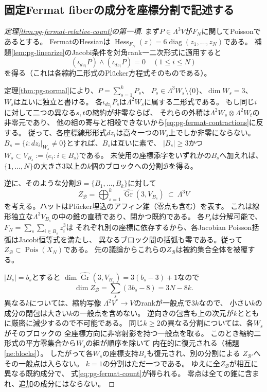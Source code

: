 \subsection{固定Fermat fiberの成分を座標分割で記述する}
\begin{proof}[定理\ref{thm:pg-fermat-relative-count}の第一項]
まず$P\in\Lambda^3V$が$F_N$に関してPoissonであるとする。
FermatのHessianは
$\operatorname{Hess}_{F_N}(z)=6\operatorname{diag}(z_1,\ldots,z_N)$である。
補題\ref{lem:pg-linearize}のJacobi条件を対角rank一二次形式に適用すると
\begin{equation}
 \label{eq:pg-fermat-contractions}
 (\iota_{dz_i}P)\wedge(\iota_{dz_i}P)=0
 \quad(1\le i\le N)
\end{equation}
を得る（これは各縮約二形式のPl\"ucker方程式そのものである）。

定理\ref{thm:pg-normal}により、$P=\sum_{s=1}^k P_s$、
$P_s\in\Lambda^3 W_s\setminus\{0\}$、$\dim W_s=3$、
$W_s$は互いに独立と書ける。
各$\iota_{dz_i}P_s$は$\Lambda^2W_s$に属する二形式である。
もし同じ$i$に対して二つの異なる$s,t$の縮約が非零ならば、
それらの外積は$\Lambda^2W_s\otimes\Lambda^2W_t$の非零元であり、
他の組の寄与と相殺できないから\eqref{eq:pg-fermat-contractions}に反する。
従って、各座標線形形式$dz_i$は高々一つの$W_s$上でしか非零にならない。
$B_s=\{i:dz_i|_{W_s}\ne0\}$とすれば、$B_s$は互いに素で、
$|B_s|\ge3$かつ$W_s\subset V_{B_s}:=\langle e_i:i\in B_s\rangle$である。
未使用の座標添字をいずれかの$B_s$へ加えれば、
$\{1,\ldots,N\}$の大きさ$3$以上の$k$個のブロックへの分割$\mathcal B$を得る。

逆に、そのような分割$\mathcal B=\{B_1,\ldots,B_k\}$に対して
\[
 Z_{\mathcal B}=\bigoplus_{s=1}^k
 \widehat{\operatorname{Gr}}(3,V_{B_s})
 \ \subset\ \Lambda^3V
\]
を考える。ハットはPl\"ucker埋込のアフィン錐（零点も含む）を表す。
これは線形独立な$\Lambda^3V_{B_s}$の中の錐の直積であり、閉かつ既約である。
各$P_s$は分解可能で、$F_N=\sum_s\sum_{i\in B_s}z_i^3$は
それぞれ別の座標に依存するから、各Jacobian Poisson括弧はJacobi恒等式を満たし、
異なるブロック間の括弧も零である。従って
$Z_{\mathcal B}\subset\operatorname{Pois}(X_N)$である。
先の議論からこれらの$Z_{\mathcal B}$は被約集合全体を被覆する。

$|B_s|=b_s$とすると
$\dim\widehat{\operatorname{Gr}}(3,V_{B_s})=3(b_s-3)+1$なので
\[
 \dim Z_{\mathcal B}=\sum_s(3b_s-8)=3N-8k.
\]
異なる$k$については、縮約写像
$\Lambda^2V^*\to V$のrankが一般点で$3k$なので、
小さい$k$の成分の閉包は大きい$k$の一般点を含めない。
逆向きの包含も上の次元が$k$とともに厳密に減少するので不可能である。
同じ$k\ge2$の異なる分割については、各$W_s$がそのブロックの
全座標方向に非零射影を持つ一般点を取る。
このとき縮約二形式の平方零集合から$W_s$の組が順序を除いて
内在的に復元される（補題\ref{ne:blocks}）。
したがって各$W_s$の座標支持$B_s$も復元され、別の分割による
$Z_{\mathcal B'}$へその一般点は入らない。
$k=1$の分割はただ一つである。
ゆえに全$Z_{\mathcal B}$が相互に異なる既約成分で、
式\eqref{eq:pg-fermat-count}が得られる。
零点は全ての錐に含まれ、追加の成分にはならない。
\end{proof}

